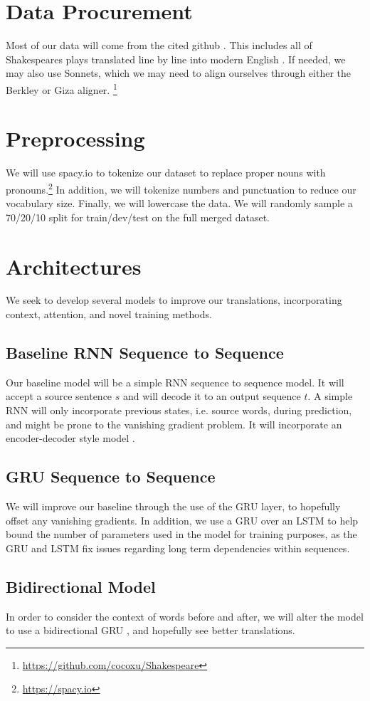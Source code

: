 \documentclass[twoside,twocolumn]{article}
\begin{document}
\section{Data Procurement}
Most of our data will come from the cited github \cite{xu2012paraphrasing}. This includes all of Shakespeares plays translated line by line into modern English . If needed, we may also use Sonnets, which we may need to align ourselves through either the Berkley or Giza aligner. \footnote{\url{https://github.com/cocoxu/Shakespeare}}

\section{Preprocessing}
We will use spacy.io to tokenize our dataset to replace proper nouns with pronouns.\footnote{\url{https://spacy.io}} In addition, we will tokenize numbers and punctuation to reduce our vocabulary size. Finally, we will lowercase the data. We will randomly sample a 70/20/10 split for train/dev/test on the full merged dataset.

\section{Architectures}
We seek to develop several models to improve our translations, incorporating context, attention, and novel training methods.

\subsection{Baseline RNN Sequence to Sequence}
Our baseline model will be a simple RNN sequence to sequence model. It will accept a source sentence $s$ and will decode it to an output sequence $t$. A simple RNN will only incorporate previous states, i.e. source words, during prediction, and might be prone to the vanishing gradient problem. It will incorporate an encoder-decoder style model \cite{cho2014learning} \cite{sutskever2014sequence}.
\subsection{GRU Sequence to Sequence}
We will improve our baseline through the use of the GRU layer, to hopefully offset any vanishing gradients. In addition, we use a GRU over an LSTM to help bound the number of parameters used in the model for training purposes, as the GRU and LSTM fix issues regarding long term dependencies within sequences.
\subsection{Bidirectional Model}
In order to consider the context of words before and after, we will alter the model to use a bidirectional GRU \cite{bahdanau2014neural}, and hopefully see better translations.
\end{document}
